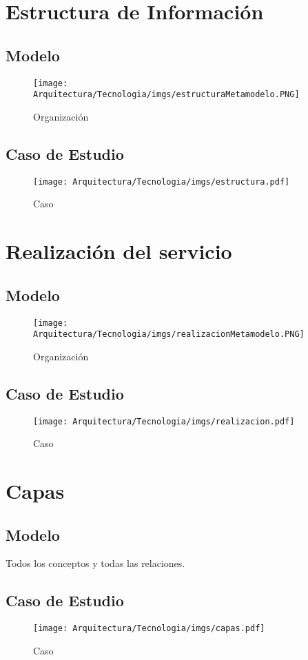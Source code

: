 \newpage

\section{Estructura de Información}
\subsection{Modelo}
\begin{figure}[h!]
	\centering
	\texttt{[image: Arquitectura/Tecnologia/imgs/estructuraMetamodelo.PNG]}
	\caption{Organización}
\end{figure}
\newpage
\subsection{Caso de Estudio}

\begin{figure}[h!]
	\centering
	\texttt{[image: Arquitectura/Tecnologia/imgs/estructura.pdf]}
	\caption{Caso}
\end{figure}

\newpage

\section{Realización del servicio}
\subsection{Modelo}
\begin{figure}[h!]
	\centering
	\texttt{[image: Arquitectura/Tecnologia/imgs/realizacionMetamodelo.PNG]}
	\caption{Organización}
\end{figure}
\newpage
\subsection{Caso de Estudio}

\begin{figure}[h!]
	\centering
	\texttt{[image: Arquitectura/Tecnologia/imgs/realizacion.pdf]}
	\caption{Caso}
\end{figure}

\newpage

\section{Capas}
\subsection{Modelo}
Todos los conceptos y todas las relaciones.
\subsection{Caso de Estudio}

\begin{figure}[h!]
	\centering
	\texttt{[image: Arquitectura/Tecnologia/imgs/capas.pdf]}
	\caption{Caso}
\end{figure}

\newpage